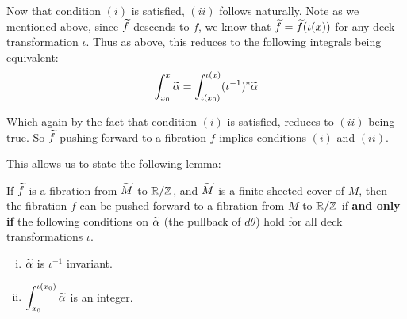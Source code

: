 Now that condition $(i)$ is satisfied, $(ii)$ follows naturally. Note as we mentioned above, since $\widetilde{f}$ descends to $f$, we know that $\widetilde{f} = \widetilde{f}(\iota(x))$ for any deck transformation $\iota$. Thus as above, this reduces to the following integrals being equivalent:
\begin{align*}
  \int_{x_0}^x \widetilde{\alpha} = \int_{\iota(x_0)}^{\iota(x)} (\iota^{-1})^{\ast} \widetilde{\alpha}
\end{align*}

Which again by the fact that condition $(i)$ is satisfied, reduces to $(ii)$ being true. So $\widetilde{f}$ pushing forward to a fibration $f$ implies conditions $(i)$ and $(ii)$.

This allows us to state the following lemma:

\begin{lem}
  If $\widetilde{f}$ is a fibration from $\widetilde{M}$ to $\mathbb{R}/\mathbb{Z}$, and $\widetilde{M}$ is a finite sheeted cover of
  $M$, then the fibration $f$ can be pushed forward to a fibration from $M$ to $\mathbb{R}/\mathbb{Z}$ if \textbf{and only if} the
  following conditions on $\widetilde{\alpha}$ (the pullback of $d\theta$) hold for all deck
  transformations $\iota$.
  \begin{enumerate}[(i)]
  \item $\widetilde{\alpha}$ is $\iota^{-1}$ invariant.
  \item $\displaystyle \int_{x_0}^{\iota(x_0)} \widetilde{\alpha}$ is an integer.
  \end{enumerate}
\end{lem}

